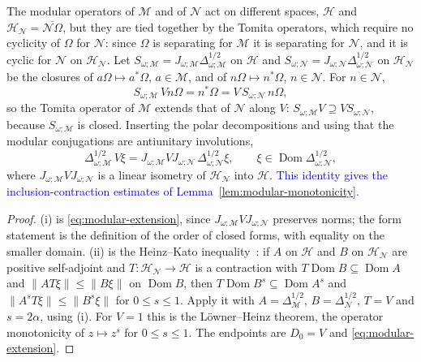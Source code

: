 \documentclass[a4paper,11pt]{article}
\theoremstyle{definition}
\newcommand{\mN}{\mathcal{N}}
\newcommand{\mH}{\mathcal{H}}
\newcommand{\mM}{\mathcal{M}}
\newcommand{\NL}[1]{\textcolor{blue}{#1}}
\begin{document}
The modular operators of $\mM$ and of $\mN$ act on different spaces, $\mathcal H$ and $\mH_{\mN}=\overline{\mN\Omega}$, but they are tied together by the Tomita operators, which require no cyclicity of $\Omega$ for $\mN$: since $\Omega$ is separating for $\mM$ it is separating for $\mN$, and it is cyclic for $\mN$ on $\mH_{\mN}$. Let $S_{\omega;\mM}=J_{\omega;\mM}\Delta_{\omega;\mM}^{1/2}$ on $\mathcal H$ and $S_{\omega;\mN}=J_{\omega;\mN}\Delta_{\omega;\mN}^{1/2}$ on $\mH_{\mN}$ be the closures of $a\Omega\mapsto a^*\Omega$, $a\in\mM$, and of $n\Omega\mapsto n^*\Omega$, $n\in\mN$. For $n\in\mN$,
\begin{equation}
  S_{\omega;\mM}\,Vn\Omega=n^*\Omega=V\,S_{\omega;\mN}\,n\Omega ,
  \label{eq:Tomita-extension}
\end{equation}
so the Tomita operator of $\mM$ extends that of $\mN$ along $V$: $S_{\omega;\mM}V\supseteq VS_{\omega;\mN}$, because $S_{\omega;\mM}$ is closed. Inserting the polar decompositions and using that the modular conjugations are antiunitary involutions,
\begin{equation}
  \Delta_{\omega;\mM}^{1/2}\,V\xi=J_{\omega;\mM}VJ_{\omega;\mN}\,\Delta_{\omega;\mN}^{1/2}\xi ,
  \qquad \xi\in\operatorname{Dom}\Delta_{\omega;\mN}^{1/2},
  \label{eq:modular-extension}
\end{equation}
where $J_{\omega;\mM}VJ_{\omega;\mN}$ is a linear isometry of $\mH_{\mN}$ into $\mathcal H$. \NL{This identity gives the inclusion-contraction estimates of Lemma~\ref{lem:modular-monotonicity}.}

\begin{proof}
(i) is \eqref{eq:modular-extension}, since $J_{\omega;\mM}VJ_{\omega;\mN}$ preserves norms; the form statement is the definition of the order of closed forms, with equality on the smaller domain. (ii) is the Heinz--Kato inequality~\cite{Kato1952}: if $A$ on $\mathcal H$ and $B$ on $\mH_{\mN}$ are positive self-adjoint and $T:\mH_{\mN}\to\mathcal H$ is a contraction with $T\operatorname{Dom}B\subseteq\operatorname{Dom}A$ and $\|AT\xi\|\le\|B\xi\|$ on $\operatorname{Dom}B$, then $T\operatorname{Dom}B^{s}\subseteq\operatorname{Dom}A^{s}$ and $\|A^{s}T\xi\|\le\|B^{s}\xi\|$ for $0\le s\le1$. Apply it with $A=\Delta_{\mM}^{1/2}$, $B=\Delta_{\mN}^{1/2}$, $T=V$ and $s=2\alpha$, using (i). For $V=1$ this is the L\"owner--Heinz theorem, the operator monotonicity of $z\mapsto z^{s}$ for $0\le s\le1$. The endpoints are $D_0=V$ and \eqref{eq:modular-extension}.
\end{proof}
\end{document}
